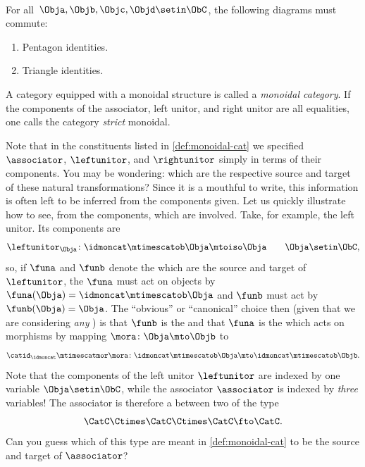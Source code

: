 \begin{ctdefinition}
    \condit\\
    For all~$\Obja,\Objb,\Objc,\Objd\setin \ObC$, the following diagrams must commute:
    \begin{enumerate}
        \item Pentagon identities.
        \item Triangle identities.
    \end{enumerate}

    A category equipped with a monoidal structure is called a \emph{monoidal category}.
    If the components of the associator, left unitor, and right unitor are all equalities, one calls the category \emph{strict} monoidal.
\end{ctdefinition}

\begin{remark}
    Note that in the constituents listed in \cref{def:monoidal-cat} we specified  $\associator$, $\leftunitor$, and $\rightunitor$ simply in terms of their components.
    You may be wondering: which  are the respective source and target of these natural transformations?
    Since it is a mouthful to write, this information is often left to be inferred from the components given.
    Let us quickly illustrate how to see, from the components, which  are involved.
    Take, for example, the left unitor.
    Its components are
    \begin{equation}
        \leftunitor_\Obja \colon \idmoncat\mtimescatob \Obja \mtoiso \Obja \quad \quad \Obja\setin \ObC,
    \end{equation}
    so, if $\funa$ and $\funb$ denote the  which are the source and target of $\leftunitor$, the  $\funa$ must act on objects by $\funa(\Obja) = \idmoncat \mtimescatob \Obja$ and $\funb$ must act by $\funb(\Obja) = \Obja$.
    The ``obvious'' or ``canonical'' choice then (given that we are considering \emph{any} ) is that $\funb$ is the  and that $\funa$ is the  which acts on morphisms by mapping $\mora \colon \Obja \mto \Objb$ to
    \begin{equation}
        \catid_\idmoncat \mtimescatmor \mora \colon \idmoncat\mtimescatob \Obja \mto \idmoncat\mtimescatob \Objb.
    \end{equation}
    Note that the components of the left unitor $\leftunitor$ are indexed by one variable $\Obja \setin \ObC$, while the associator $\associator$ is indexed by \emph{three} variables!
    The associator is therefore a  between two  of the type
    \begin{equation}
        \CatC \Ctimes \CatC \Ctimes \CatC \fto \CatC.
    \end{equation}
    Can you guess which  of this type are meant in \cref{def:monoidal-cat} to be the source and target of $\associator$?
\end{remark}

